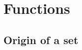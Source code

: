 \documentclass[12pt, a4paper]{article}
\begin{document}
    
    \maketitle

    \newpage

    \tableofcontents

    \newpage

    \section{Functions}

    \subsection{Origin of a set}

    
    
\end{document}
